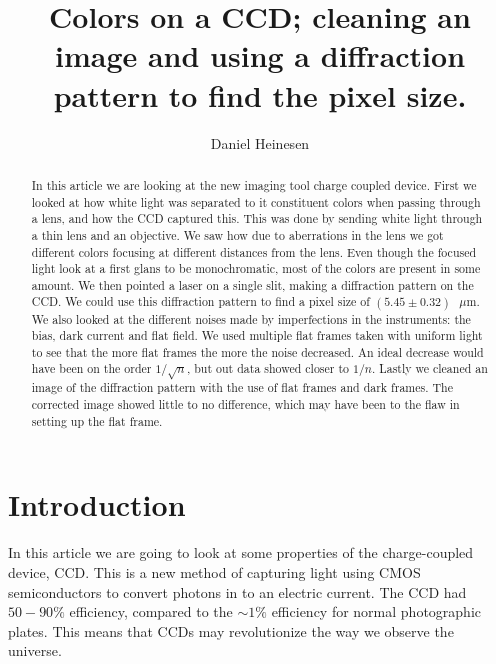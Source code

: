 \documentclass{emulateapj}
\begin{document}
\title{Colors on a CCD; cleaning an image and using a diffraction pattern to find the pixel size.}

\author{Daniel Heinesen}





\begin{abstract}
  In this article we are looking at the new imaging tool charge coupled device. First we looked at how white light was separated to it constituent colors when passing through a lens, and how the CCD captured this. This was done by sending white light through a thin lens and an objective. We saw how due to aberrations in the lens we got different colors focusing at different distances from the lens. Even though the focused light look at a first glans to be monochromatic, most of the colors are present in some amount. We then pointed a laser on a single slit, making a diffraction pattern on the CCD. We could use this diffraction pattern to find a pixel size of $(5.45 \pm 0.32)\text{ }\mu\text{m}$. We also looked at the different noises made by imperfections in the instruments: the bias, dark current and flat field. We used multiple flat frames taken with uniform light to see that the more flat frames the more the noise decreased. An ideal decrease would have been on the order $1/\sqrt{n}$, but out data showed closer to $1/n$. Lastly we cleaned an image of the diffraction pattern with the use of flat frames and dark frames. The corrected image showed little to no difference, which may have been to the flaw in setting up the flat frame.
\end{abstract}

\section{Introduction}
\label{sec:introduction}

In this article we are going to look at some properties of the charge-coupled device, CCD. This is a new method of capturing light using CMOS semiconductors to convert photons in to an electric current. The CCD had $50-90\%$ efficiency, compared to the $\sim 1\%$ efficiency for normal photographic plates. This means that CCDs may revolutionize the way we observe the universe. \\
\end{document}
